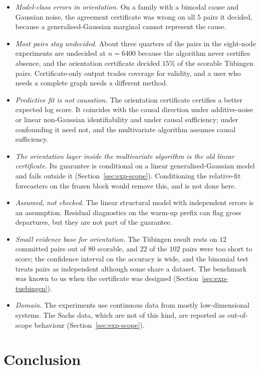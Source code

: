 \begin{itemize}
  accuracy.
\item \emph{Model-class errors in orientation.} On a family with a bimodal cause
  and Gaussian noise, the agreement certificate was wrong on all $5$ pairs it
  decided, because a generalised-Gaussian marginal cannot represent the cause.
\item \emph{Most pairs stay undecided.} About three quarters of the pairs in the
  eight-node experiments are undecided at $n=6400$ because the algorithm
  never certifies absence, and the orientation certificate decided $15\%$ of
  the scorable Tübingen pairs. Certificate-only output trades coverage for
  validity, and a user who needs a complete graph needs a different method.
\item \emph{Predictive fit is not causation.} The orientation certificate
  certifies a better expected log score. It coincides with the causal direction
  under additive-noise or linear non-Gaussian identifiability and under causal
  sufficiency; under confounding it need not, and the multivariate algorithm
  assumes causal sufficiency.
\item \emph{The orientation layer inside the multivariate algorithm is the old
  linear certificate.} Its guarantee is conditional on a linear
  generalised-Gaussian model and fails outside it (Section~\ref{sec:exp-scope}).
  Conditioning the relative-fit forecasters on the frozen block would remove
  this, and is not done here.
\item \emph{Assumed, not checked.} The linear structural model with
  independent errors is an assumption. Residual diagnostics on the warm-up
  prefix can flag gross departures, but they are not part of the guarantee.
\item \emph{Small evidence base for orientation.} The Tübingen result rests on
  $12$ committed pairs out of $80$ scorable, and $22$ of the $102$ pairs were
  too short to score; the confidence interval on the accuracy is wide, and the
  binomial test treats pairs as independent although some share a dataset. The
  benchmark was known to us when the certificate was designed
  (Section~\ref{sec:exp-tuebingen}).
\item \emph{Domain.} The experiments use continuous data from mostly low-dimensional
  systems. The Sachs data, which are not of this kind, are reported as
  out-of-scope behaviour (Section~\ref{sec:exp-scope}).
\end{itemize}

\section{Conclusion}\label{sec:conclusion}

